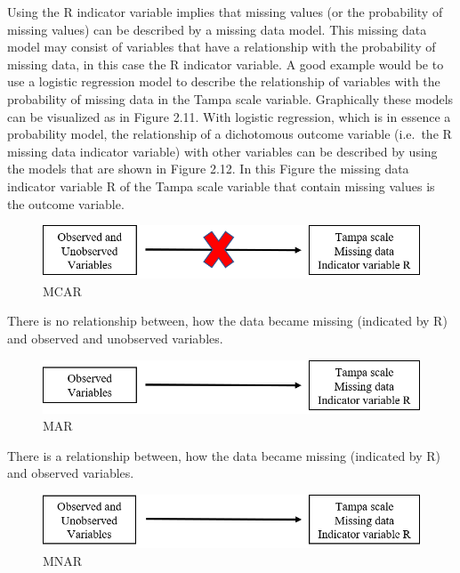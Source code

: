 \documentclass[]{book}
\begin{document}
Using the R indicator variable implies that missing values (or the
probability of missing values) can be described by a missing data model.
This missing data model may consist of variables that have a
relationship with the probability of missing data, in this case the R
indicator variable. A good example would be to use a logistic regression
model to describe the relationship of variables with the probability of
missing data in the Tampa scale variable. Graphically these models can
be visualized as in Figure 2.11. With logistic regression, which is in
essence a probability model, the relationship of a dichotomous outcome
variable (i.e.~the R missing data indicator variable) with other
variables can be described by using the models that are shown in Figure
2.12. In this Figure the missing data indicator variable R of the Tampa
scale variable that contain missing values is the outcome variable.

\begin{figure}

{\centering \includegraphics[width=0.9\linewidth]{images/fig2.9a} 

}

\caption{MCAR}\label{fig:fig35}
\end{figure}

There is no relationship between, how the data became missing (indicated
by R) and observed and unobserved variables.

\begin{figure}

{\centering \includegraphics[width=0.9\linewidth]{images/fig2.9b} 

}

\caption{MAR}\label{fig:fig36}
\end{figure}

There is a relationship between, how the data became missing (indicated
by R) and observed variables.

\begin{figure}

{\centering \includegraphics[width=0.9\linewidth]{images/fig2.9c} 

}

\caption{MNAR}\label{fig:fig37}
\end{figure}
\end{document}
